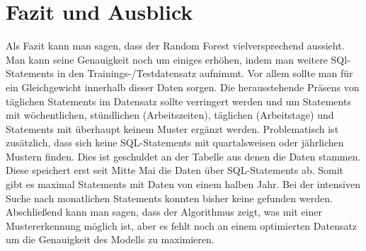 \section{Fazit und Ausblick}

Als Fazit kann man sagen, dass der Random Forest vielversprechend aussieht. Man kann seine Genauigkeit noch um einiges erhöhen, indem man weitere SQl-Statements in den Trainings-/Testdatensatz aufnimmt. Vor allem sollte man für ein Gleichgewicht innerhalb dieser Daten sorgen. Die herausstehende Präsens von täglichen Statements im Datensatz sollte verringert werden und um Statements mit wöchentlichen, stündlichen (Arbeitszeiten), täglichen (Arbeitstage) und Statements mit überhaupt keinem Muster ergänzt werden. Problematisch ist zusätzlich, dass sich keine SQL-Statements mit quartalsweisen oder jährlichen Mustern finden. Dies ist geschuldet an der Tabelle aus denen die Daten stammen. Diese speichert erst seit Mitte Mai die Daten über SQL-Statements ab. Somit gibt es maximal Statements mit Daten von einem halben Jahr. Bei der intensiven Suche nach monatlichen Statements konnten bisher keine gefunden werden. Abschließend kann man sagen, dass der Algorithmus zeigt, was mit einer Mustererkennung möglich ist, aber es fehlt noch an einem optimierten Datensatz um die Genauigkeit des Modells zu maximieren.